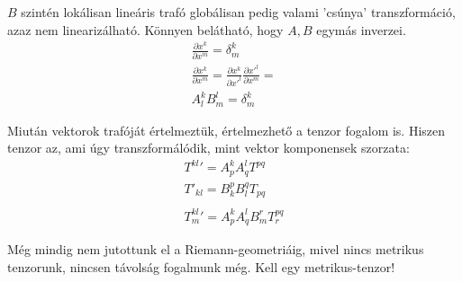 \documentclass[a4paper, 12pt]{article}
\begin{document}
\par $B$ szintén lokálisan lineáris trafó globálisan pedig valami 'csúnya' transzformáció, azaz nem linearizálható. Könnyen belátható, hogy $A,B$ egymás inverzei.
\begin{gather*}
    \frac{\partial x^{k}}{\partial x^{m}} = \delta^{k}_{m} \\
    \frac{\partial x^{k}}{\partial x^{m}} = \frac{\partial x^{k}}{\partial x'^{l}}\frac{\partial x'^{l}}{\partial x^{m}} = \\
    A^{k}_{l}B^{l}_{m} = \delta^{k}_{m}
\end{gather*}
\par Miután vektorok trafóját értelmeztük, értelmezhető a tenzor fogalom is. Hiszen tenzor az, ami úgy transzformálódik, mint vektor komponensek szorzata:
\begin{gather*}
    T^{kl}' = A^{k}_{p}A^{l}_{q}T^{pq} \\
    T'_{kl} = B_{k}^{p}B_{l}^{q}T_{pq} \\ \\
    T^{kl}_{m}' = A^{k}_{p} A^{l}_{q} B^{r}_{m} T^{pq}_{r}
\end{gather*}
\par Még mindig nem jutottunk el a Riemann-geometriáig, mivel nincs metrikus tenzorunk, nincsen távolság fogalmunk még. Kell egy metrikus-tenzor!
\end{document}
